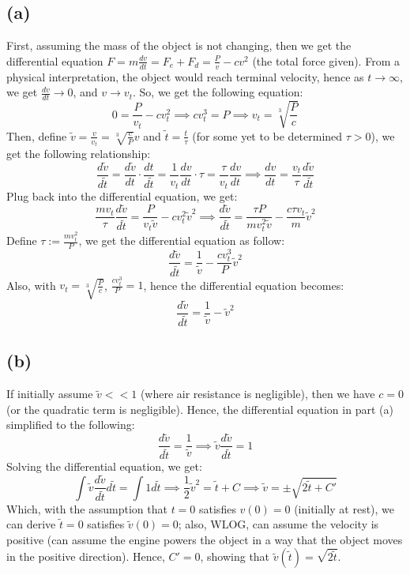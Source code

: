\documentclass{article}
\begin{document}
\subsection*{(a)}
First, assuming the mass of the object is not changing, then we get the differential equation $F = m\frac{dv}{dt} = F_e + F_d = \frac{P}{v}-cv^2$ (the total force given). From a physical interpretation, the object would reach terminal velocity, hence as $t\rightarrow\infty$, we get $\frac{dv}{dt}\rightarrow 0$, and $v\rightarrow v_t$. So, we get the following equation:
$$0 = \frac{P}{v_t}-cv_t^2 \implies cv_t^3 = P\implies v_t = \sqrt[3]{\frac{P}{c}}$$
Then, define $\tilde{v}=\frac{v}{v_t} = \sqrt[3]{\frac{c}{P}}v$ and $\tilde{t}=\frac{t}{\tau}$ (for some yet to be determined $\tau>0$), we get the following relationship:
$$\frac{d\tilde{v}}{d\tilde{t}} = \frac{d\tilde{v}}{dt}\cdot \frac{dt}{d\tilde{t}} = \frac{1}{v_t}\frac{dv}{dt}\cdot \tau = \frac{\tau}{v_t}\frac{dv}{dt}\implies \frac{dv}{dt}=\frac{v_t}{\tau}\frac{d\tilde{v}}{d\tilde{t}}$$
Plug back into the differential equation, we get:
$$\frac{mv_t}{\tau}\frac{d\tilde{v}}{d\tilde{t}}=\frac{P}{v_t\tilde{v}}-cv_t^2\tilde{v}^2\implies \frac{d\tilde{v}}{d\tilde{t}} = \frac{\tau P}{mv_t^2\tilde{v}}-\frac{c\tau v_t}{m}\tilde{v}^2$$
Define $\tau := \frac{mv_t^2}{P}$, we get the differential equation as follow:
$$\frac{d\tilde{v}}{d\tilde{t}} = \frac{1}{\tilde{v}}-\frac{cv_t^3}{P}\tilde{v}^2$$
Also, with $v_t =\sqrt[3]{\frac{P}{c}}$, $\frac{cv_t^3}{P}=1$, hence the differential equation becomes:
$$\frac{d\tilde{v}}{d\tilde{t}} = \frac{1}{\tilde{v}}-\tilde{v}^2$$

\subsection*{(b)}
If initially assume $\tilde{v}<<1$ (where air resistance is negligible), then we have $c=0$ (or the quadratic term is negligible). Hence, the differential equation in part (a) simplified to the following:
$$\frac{d\tilde{v}}{d\tilde{t}}=\frac{1}{\tilde{v}}\implies \tilde{v}\frac{d\tilde{v}}{d\tilde{t}}=1$$
Solving the differential equation, we get:
$$\int \tilde{v}\frac{d\tilde{v}}{d\tilde{t}}d\tilde{t} = \int 1d\tilde{t}\implies \frac{1}{2}\tilde{v}^2=\tilde{t}+C\implies \tilde{v} = \pm\sqrt{2\tilde{t}+C'}$$
Which, with the assumption that $t=0$ satisfies $v(0) = 0$ (initially at rest), we can derive $\tilde{t}=0$ satisfies $\tilde{v}(0) = 0$; also, WLOG, can assume the velocity is positive (can assume the engine powers the object in a way that the object moves in the positive direction). Hence, $C' = 0$, showing that $\tilde{v}(\tilde{t})=\sqrt{2\tilde{t}}$.
\end{document}
